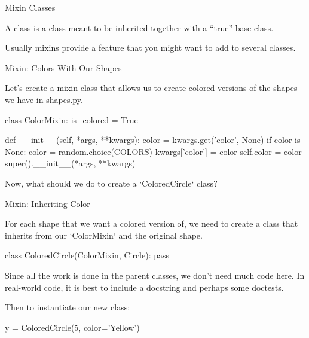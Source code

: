 \documentclass[aspectratio=149] {beamer}
\begin{document}
\begin{frame}{Mixin Classes}
  
  A  class is a class meant to be inherited together with a ``true'' base class.
  
  \bigskip
  
  Usually mixins provide a feature that you might want to add to several classes.
  
\end{frame}


\begin{frame}[fragile]{Mixin: Colors With Our Shapes}
  
  Let's create a mixin class that allows us to create colored versions of the shapes we have in shapes.py.
  
  \begin{pythoncode}
    class ColorMixin:
        is_colored = True
    
        def __init__(self, *args, **kwargs):
            color = kwargs.get('color', None)
            if color is None:
                color = random.choice(COLORS)
                kwargs['color'] = color
            self.color = color
            super().__init__(*args, **kwargs)
    
  \end{pythoncode}

  \pause \medskip
  
  Now, what should we do to create a \inline`ColoredCircle` class?
  
\end{frame}


\begin{frame}[fragile]{Mixin: Inheriting Color}
  
  For each shape that we want a colored version of, 
  we need to create a class that inherits from our \inline`ColorMixin`
  and the original shape.
  
  \begin{pythoncode}
    class ColoredCircle(ColorMixin, Circle):
        pass

  \end{pythoncode}

  Since all the work is done in the parent classes,
  we don't need much code here.
  In real-world code, it is best to include a docstring and 
  perhaps some doctests.

  \pause \medskip
  
  Then to instantiate our new class:


  \begin{pythoncode}
    y = ColoredCircle(5, color='Yellow')
  \end{pythoncode}

\end{frame}
\end{document}
